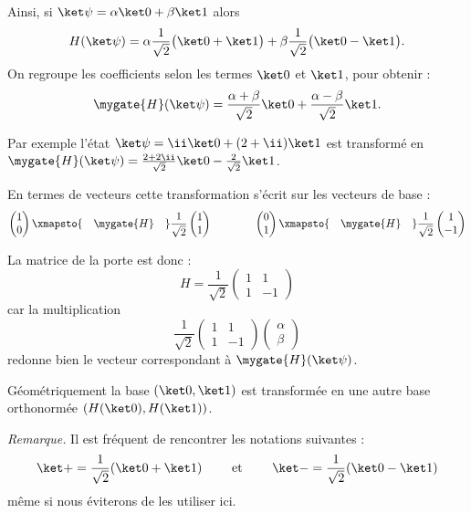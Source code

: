 \documentclass[11pt,class=report,crop=false]{standalone}
\begin{document}
Ainsi, si $\ket\psi = \alpha  \ket 0 + \beta \ket 1$
alors 
$$H(\ket\psi) 
= \alpha\frac1{\sqrt2} \big(\ket0+\ket1\big) + \beta\frac1{\sqrt2}\big(\ket0-\ket1\big).$$
On regroupe les coefficients selon les termes $\ket0$ et $\ket1$, pour obtenir :
$$\mygate{H}(\ket\psi) 
= \frac{\alpha+\beta}{\sqrt2} \ket0+  \frac{\alpha-\beta}{\sqrt2}\ket1.$$

Par exemple l'état $\ket \psi = \ii\ket0 + (2+\ii) \ket 1$ est transformé en
$\mygate{H}(\ket\psi) = \frac{2+2\ii}{\sqrt2}\ket0- \frac{2}{\sqrt2}\ket1$.



En termes de vecteurs cette transformation s'écrit sur les vecteurs de base :
$$\begin{pmatrix}1\\0\end{pmatrix} \xmapsto{\quad\mygate{H}\quad} \frac1{\sqrt2}\begin{pmatrix}1\\1\end{pmatrix}
\qquad\qquad \begin{pmatrix}0\\1\end{pmatrix} \xmapsto{\quad\mygate{H}\quad} \frac1{\sqrt2}\begin{pmatrix}1\\-1\end{pmatrix}$$


La matrice de la porte  est donc :
$$H = \frac1{\sqrt2}\begin{pmatrix}1&1\\1&-1\end{pmatrix}$$
  car la multiplication
  $$\frac1{\sqrt2}\begin{pmatrix}1&1\\1&-1\end{pmatrix}
\begin{pmatrix}\alpha\\\beta\end{pmatrix}$$
redonne bien le vecteur correspondant à $\mygate{H}(\ket\psi)$.

Géométriquement la base $(\ket0,\ket1)$ est transformée en une autre base orthonormée $(H(\ket0),H(\ket1))$.



\emph{Remarque.} Il est fréquent de rencontrer les notations suivantes :
$$\ket+ = \frac1{\sqrt2} (\ket0+\ket1) \qquad \text{ et  } \qquad \ket- = \frac1{\sqrt2} (\ket0-\ket1)$$ 
même si nous éviterons de les utiliser ici.
\end{document}
